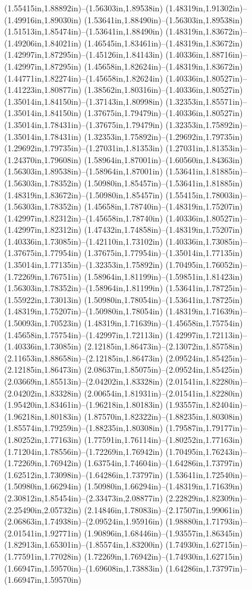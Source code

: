 (1.55415in,1.88892in)--(1.56303in,1.89538in) (1.48319in,1.91302in)--(1.49916in,1.89030in) (1.53641in,1.88490in)--(1.56303in,1.89538in) (1.51513in,1.85474in)--(1.53641in,1.88490in) (1.48319in,1.83672in)--(1.49206in,1.84021in) (1.46545in,1.83461in)--(1.48319in,1.83672in) (1.42997in,1.87295in)--(1.45126in,1.84143in) (1.40336in,1.88716in)--(1.42997in,1.87295in) (1.45658in,1.82624in)--(1.48319in,1.83672in) (1.44771in,1.82274in)--(1.45658in,1.82624in) (1.40336in,1.80527in)--(1.41223in,1.80877in) (1.38562in,1.80316in)--(1.40336in,1.80527in) (1.35014in,1.84150in)--(1.37143in,1.80998in) (1.32353in,1.85571in)--(1.35014in,1.84150in) (1.37675in,1.79479in)--(1.40336in,1.80527in) (1.35014in,1.78431in)--(1.37675in,1.79479in) (1.32353in,1.75892in)--(1.35014in,1.78431in) (1.32353in,1.75892in)--(1.29692in,1.79735in) (1.29692in,1.79735in)--(1.27031in,1.81353in) (1.27031in,1.81353in)--(1.24370in,1.79608in) (1.58964in,1.87001in)--(1.60560in,1.84363in) (1.56303in,1.89538in)--(1.58964in,1.87001in) (1.53641in,1.81885in)--(1.56303in,1.78352in) (1.50980in,1.85457in)--(1.53641in,1.81885in) (1.48319in,1.83672in)--(1.50980in,1.85457in) (1.55415in,1.78003in)--(1.56303in,1.78352in) (1.45658in,1.78740in)--(1.48319in,1.75207in) (1.42997in,1.82312in)--(1.45658in,1.78740in) (1.40336in,1.80527in)--(1.42997in,1.82312in) (1.47432in,1.74858in)--(1.48319in,1.75207in) (1.40336in,1.73085in)--(1.42110in,1.73102in) (1.40336in,1.73085in)--(1.37675in,1.77954in) (1.37675in,1.77954in)--(1.35014in,1.77135in) (1.35014in,1.77135in)--(1.32353in,1.75892in) (1.70495in,1.76052in)--(1.72269in,1.76751in) (1.58964in,1.81199in)--(1.59851in,1.81423in) (1.56303in,1.78352in)--(1.58964in,1.81199in) (1.53641in,1.78725in)--(1.55922in,1.73013in) (1.50980in,1.78054in)--(1.53641in,1.78725in) (1.48319in,1.75207in)--(1.50980in,1.78054in) (1.48319in,1.71639in)--(1.50093in,1.70523in) (1.48319in,1.71639in)--(1.45658in,1.75754in) (1.45658in,1.75754in)--(1.42997in,1.72113in) (1.42997in,1.72113in)--(1.40336in,1.73085in) (2.12185in,1.86473in)--(2.13072in,1.85758in) (2.11653in,1.88658in)--(2.12185in,1.86473in) (2.09524in,1.85425in)--(2.12185in,1.86473in) (2.08637in,1.85075in)--(2.09524in,1.85425in) (2.03669in,1.85513in)--(2.04202in,1.83328in) (2.01541in,1.82280in)--(2.04202in,1.83328in) (2.00654in,1.81931in)--(2.01541in,1.82280in) (1.95420in,1.83461in)--(1.96218in,1.80183in) (1.93557in,1.82404in)--(1.96218in,1.80183in) (1.87570in,1.82322in)--(1.88235in,1.80308in) (1.85574in,1.79259in)--(1.88235in,1.80308in) (1.79587in,1.79177in)--(1.80252in,1.77163in) (1.77591in,1.76114in)--(1.80252in,1.77163in) (1.71204in,1.78556in)--(1.72269in,1.76942in) (1.70495in,1.76243in)--(1.72269in,1.76942in) (1.63754in,1.74604in)--(1.64286in,1.73797in) (1.62512in,1.73098in)--(1.64286in,1.73797in) (1.53641in,1.72540in)--(1.50980in,1.66294in) (1.50980in,1.66294in)--(1.48319in,1.71639in) (2.30812in,1.85454in)--(2.33473in,2.08877in) (2.22829in,1.82309in)--(2.25490in,2.05732in) (2.14846in,1.78083in)--(2.17507in,1.99061in) (2.06863in,1.74938in)--(2.09524in,1.95916in) (1.98880in,1.71793in)--(2.01541in,1.92771in) (1.90896in,1.68446in)--(1.93557in,1.86345in) (1.82913in,1.65301in)--(1.85574in,1.83200in) (1.74930in,1.62715in)--(1.77591in,1.77028in) (1.72269in,1.76942in)--(1.74930in,1.62715in) (1.66947in,1.59570in)--(1.69608in,1.73883in) (1.64286in,1.73797in)--(1.66947in,1.59570in) 